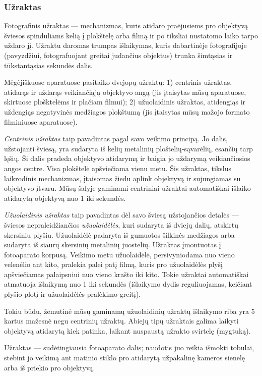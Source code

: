 \documentclass[12pt]{book}
\begin{document}
				\subsubsection*{Užraktas}
					Fotografinis užraktas --- mechanizmas, kuris atidaro praėjusiems pro objektyvą šviesos spinduliams kelią į plokštelę arba filmą ir po tiksliai nustatomo laiko tarpo uždaro jį. Užraktu daromas trumpas išlaikymas, kuris dabartinėje fotografijoje (pavyzdžiui, fotografuojant greitai judančius objektus) trunka šimtąsias ir tūkstantąsias sekundės dalis.

					Mėgėjiškuose aparatuose pasitaiko dvejopų užraktų: 1) centrinis užraktas, atidarąs ir uždarąs veikiančiąją objektyvo angą (jis įtaisytas mūsų aparatuose, skirtuose plošktelėms ir plačiam filmui); 2) užuolaidinis užraktas, atidengiąs ir uždengiąs negatyvinės medžiagos plokštumą (jis įtaisytas mūsų mažojo formato filminiuose aparatuose).

					\textit{Centrinis užraktas} taip pavadintas pagal savo veikimo principą. Jo dalis, užstojanti šviesą, yra sudaryta iš kelių metalinių ploštelių-sąvarėlių, esančių tarp lęšių. Ši dalis pradeda objektyvo atidarymą ir baigia jo uždarymą veikiančiosios angos centre. Visa plokštelė apšviečiama vienu metu. Šis užraktas, tikslus laikrodinis mechanizmas, įtaisomas žiedu aplink objektyvą ir sujungiamas su objektyvo įtvaru. Mūsų šalyje gaminami centriniai užraktai automatiškai išlaiko atidarytą objektyvą nuo 1 iki  sekundės.

					\textit{Užuolaidinis užraktas} taip pavadintas dėl savo šviesą užstojančios detalės --- šviesos nepraleidžiančios \textit{užuolaidėlės}, kuri sudaryta iš dviejų dalių, atskirtų skersiniu plyšiu. Užuolaidėlė padaryta iš gumuotos šilkinės medžiagos arba sudaryta iš siaurų skersinių metalinių juostelių. Užraktas įmontuotas į fotoaparato korpusą. Veikimo metu užuolaidėlė, persivyniodama nuo vieno velenėlio ant kito, pralekia palei patį filmą, kuris pro užuolaidėlės plyšį apšviečiamas palaipsniui nuo vieno krašto iki kito. Tokie užraktai automatiškai atmatuoja išlaikymą nuo 1 iki  sekundės (išlaikymo dydis reguliuojamas, keičiant plyšio plotį ir užuolaidėlės pralėkimo greitį).

					Tokiu būdu, žemutinė mūsų gaminamų užuolaidinių užraktų išlaikymo riba yra 5 kartus mažesnė negu centrinių užraktų. Abiejų tipų užraktais galima laikyti objektyvą atidarytą kiek patinka, laikant nuspaustą užrakto svirtelę (mygtuką).

					Užraktas --- sudėtingiausia fotoaparato dalis; naudotis juo reikia išmokti tobulai, stebint jo veikimą ant matinio stiklo pro atidarytą užpakalinę kameros sienelę arba iš priekio pro objektyvą.
\end{document}
